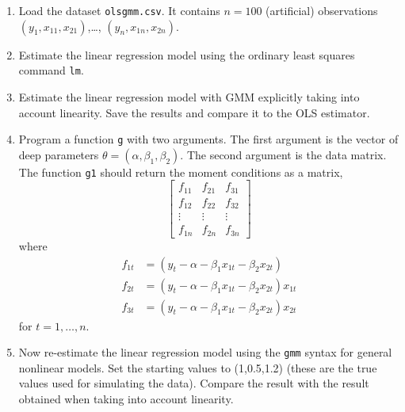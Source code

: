 \documentclass{article}
\begin{document}
\begin{enumerate}  \setlength{\itemsep}{5pt}

\item Load the dataset \texttt{olsgmm.csv}. It contains $n=100$ (artificial) observations $(y_1,x_{11},x_{21})$,\dots, $(y_n,x_{1n},x_{2n})$.
\item Estimate the linear regression model using the ordinary least squares command \texttt{lm}.
\item Estimate the linear regression model with GMM explicitly taking into account linearity. Save the results and compare it to the OLS estimator.
\item Program a function \texttt{g} with two arguments. The first argument is the vector of deep parameters $\theta = (\alpha,\beta_1,\beta_2)$. The second argument is the data matrix. The function \texttt{g1} should return the moment conditions as a matrix,
    \begin{equation*}
      \begin{bmatrix}
        f_{11}    & f_{21}      & f_{31}\\
        f_{12}    & f_{22}      & f_{32}\\
        \vdots & \vdots & \vdots\\
        f_{1n}    & f_{2n}      & f_{3n}
      \end{bmatrix}
    \end{equation*}
    where
    \begin{align*}
      f_{1t} &= (y_t - \alpha - \beta_1 x_{1t} - \beta_2 x_{2t})\\
      f_{2t} &= (y_t - \alpha - \beta_1 x_{1t} - \beta_2 x_{2t})x_{1t}\\
      f_{3t} &= (y_t - \alpha - \beta_1 x_{1t} - \beta_2 x_{2t})x_{2t}
    \end{align*}
    for $t=1,\dots,n$.
\item Now re-estimate the linear regression model using the \texttt{gmm} syntax for general nonlinear models. Set the starting values to (1,0.5,1.2) (these are the true values used for simulating the data). Compare the result with the result obtained when taking into account linearity.
\end{enumerate}
\end{document}
